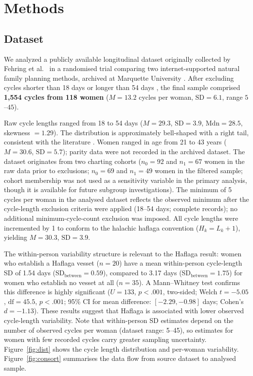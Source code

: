 \documentclass[12pt]{article}
\begin{document}
\section{Methods}
\label{sec:methods}

\subsection{Dataset}
\label{sec:data}

We analyzed a publicly available longitudinal dataset originally collected by Fehring
et al.\ \cite{fehring2013} in a randomised trial comparing two internet-supported
natural family planning methods, archived at Marquette University
\cite{marquette2013data}. After excluding cycles shorter than 18 days or longer than
54 days \cite{creinin2004}, the final sample comprised \textbf{1,554 cycles from 118
women} ($M = 13.2$ cycles per woman, $\text{SD} = 6.1$, range $5$--$45$).

Raw cycle lengths ranged from 18 to 54 days ($M = 29.3$, $\text{SD} = 3.9$,
$\text{Mdn} = 28.5$, skewness $= 1.29$). The distribution is approximately
bell-shaped with a right tail, consistent with the literature
\cite{munster1992,creinin2004}. Women ranged in age from 21 to 43 years
($M = 30.6$, $\text{SD} = 5.7$); parity data were not recorded in the archived
dataset. The dataset originates from two charting cohorts
($n_0 = 92$ and $n_1 = 67$ women in the raw data prior to exclusions;
$n_0 = 69$ and $n_1 = 49$ women in the filtered sample; cohort membership
was not used as a sensitivity variable in the primary analysis, though it is
available for future subgroup investigations). The minimum of 5 cycles
per woman in the analysed dataset reflects the observed minimum after the
cycle-length exclusion criteria were applied (18--54 days; complete records);
no additional minimum-cycle-count exclusion was imposed. All cycle lengths were incremented by 1 to conform to the
halachic haflaga convention ($H_k = L_k + 1$), yielding $M = 30.3$, $\text{SD} = 3.9$.

The within-person variability structure is relevant to the Haflaga result: women who
establish a Haflaga vesset ($n = 20$) have a mean within-person cycle-length SD of 1.54 days
(SD$_{\text{between}} = 0.59$), compared to 3.17 days (SD$_{\text{between}} = 1.75$) for women who
establish no vesset at all ($n = 35$). A Mann--Whitney test confirms this difference is highly
significant ($U = 133$, $p < .001$, two-sided; Welch $t = -5.05$, $\text{df} = 45.5$, $p < .001$;
95\% CI for mean difference: $[-2.29, -0.98]$ days; Cohen's $d = -1.13$). These results suggest that
Haflaga is associated with lower observed cycle-length variability. Note that within-person SD
estimates depend on the number of observed cycles per woman (dataset range: 5--45), so estimates
for women with few recorded cycles carry greater sampling uncertainty.
Figure~\ref{fig:dist} shows the cycle length distribution and per-woman variability.
Figure~\ref{fig:consort} summarises the data flow from source dataset to analysed sample.
\end{document}
